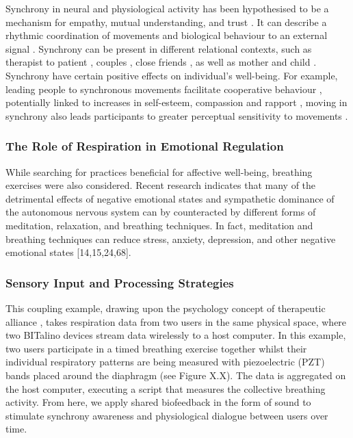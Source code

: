 Synchrony in neural and physiological activity has been hypothesised to be a mechanism for empathy, mutual understanding, and trust \cite{wallot_beyond_2016}. It can describe a rhythmic coordination of movements and biological behaviour to an external signal \cite{koole_synchrony_2016}. Synchrony can be present in different relational contexts, such as therapist to patient \cite{koole_synchrony_2016}, couples \cite{karvonen_sympathetic_2016}, close friends \cite{miles_birds_2011}, as well as mother and child \cite{butler_emotional_2013}. Synchrony have certain positive effects on individual’s well-being. For example, leading people to synchronous movements facilitate cooperative behaviour \cite{kirschner_joint_2010}, potentially linked to increases in self-esteem, compassion and rapport \cite{lumsden_sync_2014, fujiwara_rhythmic_2020}, moving in synchrony also leads participants to greater perceptual sensitivity to movements \cite{zamm_endogenous_2016}.

\subsubsection{The Role of Respiration in Emotional Regulation}

While searching for practices beneficial for affective well-being, breathing exercises were also considered. Recent research indicates that many of the detrimental effects of negative emotional states and sympathetic dominance of the autonomous nervous system can by counteracted by different forms of meditation, relaxation, and breathing techniques. In fact, meditation and breathing techniques can reduce stress, anxiety, depression, and other negative emotional states [14,15,24,68].

\subsubsection{Sensory Input and Processing Strategies}

This coupling example, drawing upon the psychology concept of therapeutic alliance \cite{koole_synchrony_2016}, takes respiration data from two users in the same physical space, where two BITalino devices stream data wirelessly to a host computer. In this example, two users participate in a timed breathing exercise together whilst their individual respiratory patterns are being measured with piezoelectric (PZT) bands placed around the diaphragm (see Figure X.X). The data is aggregated on the host computer, executing a script that measures the collective breathing activity. From here, we apply shared biofeedback in the form of sound to stimulate synchrony awareness and physiological dialogue between users over time.

